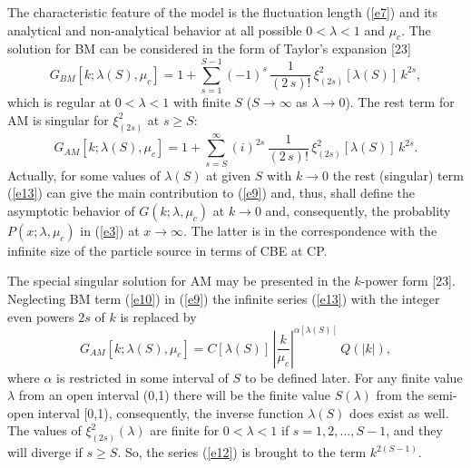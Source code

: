 \documentclass[WPCF,manyauthors]{wpcfTemplate}
\begin{document}
The characteristic feature of the model is the fluctuation length (\ref{e7}) and its analytical and non-analytical behavior at all possible $0  < \lambda < 1$ and $\mu_{c}$. The solution for BM can be considered in the form of Taylor's expansion [23]
 \begin{equation}
\label{e12}
G_{BM} [k;\lambda (S), \mu_{c}] = 1 + \sum_{s=1}^{S-1} (-1)^{s}\,\frac {1}{(2\,s)!}\,\xi_{(2s)}^{2} [\lambda (S)]\, k^{2s},
\end{equation}
which is regular at $0  < \lambda < 1$ with finite $S$ ($S\rightarrow\infty$ as $\lambda\rightarrow 0$). The rest term for AM is singular for $\xi^{2}_{(2s)}$ at $s\geq S$:
\begin{equation}
\label{e13}
G_{AM} [k;\lambda (S), \mu_{c}] = 1 + \sum_{s=S}^{\infty} (i)^{2s}\,\frac {1}{(2\,s)!}\,\xi_{(2s)}^{2} [\lambda (S)]\, k^{2s}.
\end{equation}
Actually, for some values of $\lambda (S)$ at given $S$  with $k\rightarrow 0$ the rest (singular) term (\ref{e13}) can give the main contribution to (\ref{e9}) and, thus, shall define the asymptotic behavior of $G(k;\lambda, \mu_{c})$ at  $k\rightarrow 0$ and, consequently, the probablity $P(x;\lambda, \mu_{c}) $ in (\ref{e3}) at $x\rightarrow \infty$. The latter is in the correspondence with the infinite size of the particle source in terms of CBE at CP.

The special singular solution for AM may be presented in the $k$-power form [23]. Neglecting BM term (\ref{e10}) in (\ref{e9})  the infinite series (\ref{e13}) with the integer even powers $2s$ of $k$ is replaced by 
\begin{equation}
\label{e14}
G_{AM} [k;\lambda (S), \mu_{c}] = C[\lambda (S)]\,{\left \vert \frac{k}{\mu_{c}}\right \vert}^
{\alpha [\lambda (S)]}\,Q(\vert k\vert ),
\end{equation}
where $\alpha$ is restricted in some interval of $S$ to be defined later.
For any finite value $\lambda$ from an open interval (0,1) there will be the finite value $S(\lambda)$ from the semi-open interval [0,1), consequently, the inverse function $\lambda (S)$ does exist as well. The values of $\xi^{2}_{(2s)}(\lambda)$ are finite for $0 <\lambda < 1$ if $s =1,2,..., S-1$, and they will diverge if $s\geq S$. So, the series (\ref{e12}) is brought to the term $k^{2(S-1)}$.
\end{document}
